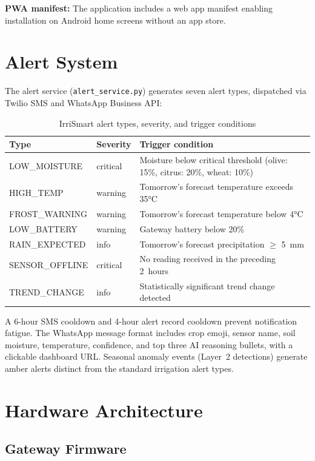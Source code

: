 \documentclass[12pt,a4paper]{report}
\begin{document}
\textbf{PWA manifest:} The application includes a web app manifest enabling installation on Android home screens without an app store.

\section{Alert System}

The alert service (\texttt{alert\_service.py}) generates seven alert types, dispatched via Twilio SMS and WhatsApp Business API:

\begin{table}[H]
\centering
\caption{IrriSmart alert types, severity, and trigger conditions}
\label{tab:alerts}
\begin{tabularx}{\textwidth}{llX}
\toprule
\textbf{Type} & \textbf{Severity} & \textbf{Trigger condition} \\
\midrule
LOW\_MOISTURE     & critical & Moisture below critical threshold (olive: 15\%, citrus: 20\%, wheat: 10\%) \\
HIGH\_TEMP        & warning  & Tomorrow's forecast temperature exceeds 35°C \\
FROST\_WARNING    & warning  & Tomorrow's forecast temperature below 4°C \\
LOW\_BATTERY      & warning  & Gateway battery below 20\% \\
RAIN\_EXPECTED    & info     & Tomorrow's forecast precipitation $\geq$ 5~mm \\
SENSOR\_OFFLINE   & critical & No reading received in the preceding 2~hours \\
TREND\_CHANGE     & info     & Statistically significant trend change detected \\
\bottomrule
\end{tabularx}
\end{table}

A 6-hour SMS cooldown and 4-hour alert record cooldown prevent notification fatigue. The WhatsApp message format includes crop emoji, sensor name, soil moisture, temperature, confidence, and top three AI reasoning bullets, with a clickable dashboard URL. Seasonal anomaly events (Layer~2 detections) generate amber alerts distinct from the standard irrigation alert types.

\section{Hardware Architecture}

\subsection{Gateway Firmware}
\end{document}
